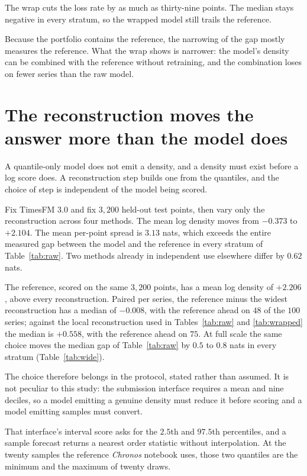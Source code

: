 \documentclass[article]{jss}
\providecommand{\pkg}[1]{\textit{#1}}
\renewcommand{\pkg}[1]{\textit{#1}}
\begin{document}
The wrap cuts the loss rate by as much as thirty-nine points. The median stays
negative in every stratum, so the wrapped model still trails the reference.

Because the portfolio contains the reference, the narrowing of the gap mostly
measures the reference. What the wrap shows is narrower: the model's density can
be combined with the reference without retraining, and the combination loses on
fewer series than the raw model.

\section{The reconstruction moves the answer more than the model does}\label{sec:nozzle}

A quantile-only model does not emit a density, and a density must exist before a
log score does. A reconstruction step builds one from the quantiles, and the
choice of step is independent of the model being scored.

Fix TimesFM 3.0 and fix $3{,}200$ held-out test points, then vary only the
reconstruction across four methods. The mean log density moves from $-0.373$ to
$+2.104$. The mean per-point spread is $3.13$ nats, which exceeds the entire
measured gap between the model and the reference in every stratum of
Table~\ref{tab:raw}. Two methods already in independent use elsewhere differ by
$0.62$ nats.

The reference, scored on the same $3{,}200$ points, has a mean log density of
$+2.206$, above every reconstruction. Paired per series, the reference minus
the widest reconstruction has a median of $-0.008$, with the reference ahead on
$48$ of the $100$ series; against the local reconstruction used in
Tables~\ref{tab:raw} and \ref{tab:wrapped} the median is $+0.558$, with the
reference ahead on $75$. At full scale the same choice moves the median gap of
Table~\ref{tab:raw} by $0.5$ to $0.8$ nats in every stratum
(Table~\ref{tab:wide}).

The choice therefore belongs in the protocol, stated rather than assumed. It is
not peculiar to this study: the \citet{aksu2024gifteval} submission interface
requires a mean and nine deciles, so a model emitting a genuine density must
reduce it before scoring and a model emitting samples must convert.

That interface's interval score asks for the $2.5$th and $97.5$th percentiles,
and a sample forecast returns a nearest order statistic without interpolation.
At the twenty samples the reference \pkg{Chronos} notebook uses, those two
quantiles are the minimum and the maximum of twenty draws.
\end{document}
